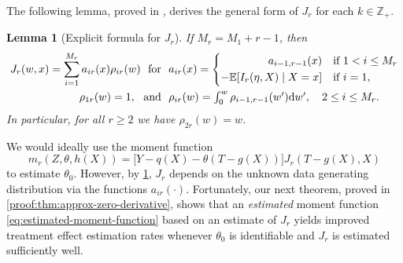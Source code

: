 \documentclass{article}
\newcommand{\E}{\mathbb{E}}
\newcommand{\dd}{\textup{d}}
\newcommand{\sstext}[1]{\ \ \text{#1}\ \ }
\newtheorem{lemma}{Lemma}[section]
\begin{document}
The following lemma, proved in , derives the general form of $J_r$ for each $k\in\mathbb{Z}_+$.
%
\begin{lemma}[Explicit formula for $J_r$]
    \label{lemma:Jk-recursive-form}
    If $M_r=M_1+r-1$, then 
    \begin{align}
        \notag
        J_r(w,x) = \sum_{i=1}^{M_r} a_{ir}(x)\rho_{ir}(w)\sstext{for} &a_{ir}(x) = \left\{
        \begin{aligned}
            a_{i-1,r-1}(x) &\quad \text{if } 1 < i \leq M_r \\
            -\E[I_{r}(\eta,X)\mid X=x] &\quad \text{if } i=1,
        \end{aligned} \right. \\
        \label{eq:def-rho-ik}
        \rho_{1r}(w) = 1, \sstext{and} &\rho_{ir}(w) = \textstyle\int_0^{w} \rho_{i-1,r-1}(w')\dd w', \quad 2\leq i\leq M_r.
    \end{align}
    In particular, for all $r\geq 2$ we have $\rho_{2r}(w) = w$.
\end{lemma}

%
%
%
%
%
%
%

%
%

%

%

We would ideally use the moment function 
\begin{equation}
    \label{eq:general-poly-moment-function}
    \textstyle
    m_r(Z,\theta,h(X)) = \big[ Y-q(X)-\theta(T-g(X)) \big] J_r(T-g(X), X) %
\end{equation}
to estimate $\theta_0$.  However, by \cref{lemma:Jk-recursive-form}, $J_r$ depends on the unknown data generating distribution via the functions $a_{ir}(\cdot)$. 
Fortunately, our next theorem, proved in \cref{proof:thm:approx-zero-derivative}, shows that an \emph{estimated} moment function \cref{eq:estimated-moment-function} based on an estimate of $J_r$ yields improved treatment effect estimation rates
whenever $\theta_0$ is identifiable and $J_r$ is estimated sufficiently well. 
\end{document}
